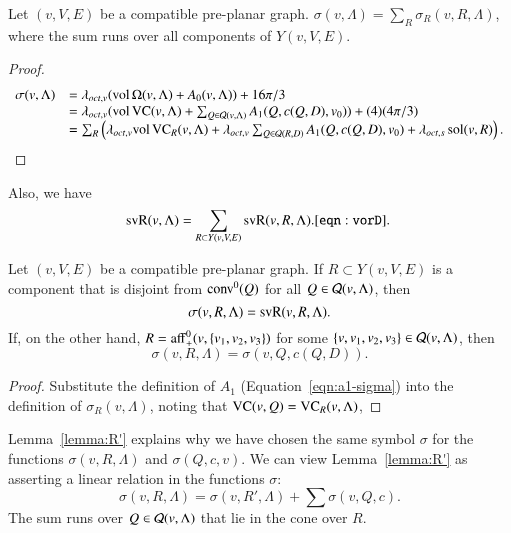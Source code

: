 \begin{lemma} 
Let $(v,V,E)$ be a compatible pre-planar graph.
$\sigma(v,\Lambda) = \sum_R\sigma_R(v,R,\Lambda)$, where the sum runs
over all components of $Y(v,V,E)$.
\end{lemma}

\begin{proof}
   $$
   \begin{array}{lll}
      \sigma(v,\Lambda)
      &= \lambda_{oct,v} ({\operatorname{vol}}\,\Omega(v,\Lambda) + A_0(v,\Lambda))+16\pi/3\\
      &= \lambda_{oct,v} ({\operatorname{vol}}\,{\operatorname{VC}}(v,\Lambda)+\sum_{Q\in{\mathcal Q}(v,\Lambda)}
         A_1(Q,c(Q,D),v_0)) + (4) (4\pi/3)\\
      &= \sum_R \left (\lambda_{oct,v} {\operatorname{vol}}\,{\operatorname{VC}}_R(v,\Lambda) 
         +\lambda_{oct,v}
         \sum_{Q\in{\mathcal Q}(R,D)} A_1(Q,c(Q,D),v_0) +
         \lambda_{oct,s}\operatorname{sol}(v,R)\right).
   \end{array}
   $$
\end{proof}

Also, we have
    \begin{equation}
    \op{svR}(v,\Lambda)=\sum_{R\subset Y(v,V,E)}
    \op{svR}(v,R,\Lambda).
    \tlabel{eqn:vorD}
    \end{equation}

\begin{lemma}
Let $(v,V,E)$ be a compatible pre-planar graph.  If $R\subset Y(v,V,E)$
is a component that is disjoint from ${\operatorname{conv}}^0(Q)$ for all 
$Q\in{\mathcal Q}(v,\Lambda)$, then
   $$
   \sigma(v,R,\Lambda) = {\operatorname{svR}}(v,R,\Lambda).
   $$
If, on the other hand, $R = {\operatorname{aff}}_+^0(v,\{v_1,v_2,v_3\})$ for
some $\{v,v_1,v_2,v_3\}\in{\mathcal Q}(v,\Lambda)$, then
   $$  
   \sigma(v,R,\Lambda) =  \sigma(v,Q,c(Q,D)).
   $$
\end{lemma}

\begin{proof} Substitute the definition of $A_1$
(Equation~\ref{eqn:a1-sigma}) into the definition of
$\sigma_R(v,\Lambda)$, noting that ${\operatorname{VC}}(v,Q) 
= {\operatorname{VC}}_{R}(v,\Lambda)$,
\end{proof}

\begin{remark}   Lemma~\ref{lemma:R'} explains why we have chosen
the same symbol $\sigma$ for the functions $\sigma(v,R,\Lambda)$ and
$\sigma(Q,c,v)$.  We can view Lemma~\ref{lemma:R'} as asserting a
linear relation in the functions $\sigma$:
   $$\sigma(v,R,\Lambda) = \sigma(v,R',\Lambda) + \sum \sigma(v,Q,c).$$
The sum runs over $Q\in{\mathcal Q}(v,\Lambda)$ that lie in the cone over $R$.
\end{remark}

